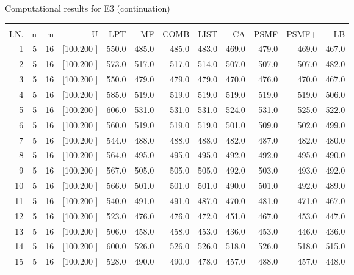 \documentclass[12pt,a4paper]{article}
\begin{document}
\newpage
\begin{center}
 Computational results for E3 (continuation) {\tiny
\begin{tabular}{r r r r r r r r r r r r}\hline
    &   &   &          &        &        &        &        &        &        &        &       \\[-0.1in]
  I.N.  &  n  &  m  &  U  &  LPT  &  MF  &  COMB  &  LIST  &  CA  & PSMF &PSMF+ & LB \\[0.03in]
\hline
   1&  5& 16&[100.200   ]&   550.0&   485.0&   485.0&   483.0&   469.0&   479.0&   469.0&   467.0\\[-0.02in]
   2&  5& 16&[100.200   ]&   573.0&   517.0&   517.0&   514.0&   507.0&   507.0&   507.0&   482.0\\[-0.02in]
   3&  5& 16&[100.200   ]&   550.0&   479.0&   479.0&   479.0&   470.0&   476.0&   470.0&   467.0\\[-0.02in]
   4&  5& 16&[100.200   ]&   585.0&   519.0&   519.0&   519.0&   519.0&   519.0&   519.0&   506.0\\[-0.02in]
   5&  5& 16&[100.200   ]&   606.0&   531.0&   531.0&   531.0&   524.0&   531.0&   525.0&   522.0\\[-0.02in]
   6&  5& 16&[100.200   ]&   560.0&   519.0&   519.0&   519.0&   501.0&   509.0&   502.0&   499.0\\[-0.02in]
   7&  5& 16&[100.200   ]&   544.0&   488.0&   488.0&   488.0&   482.0&   487.0&   482.0&   480.0\\[-0.02in]
   8&  5& 16&[100.200   ]&   564.0&   495.0&   495.0&   495.0&   492.0&   492.0&   495.0&   490.0\\[-0.02in]
   9&  5& 16&[100.200   ]&   567.0&   505.0&   505.0&   505.0&   492.0&   503.0&   493.0&   492.0\\[-0.02in]
  10&  5& 16&[100.200   ]&   566.0&   501.0&   501.0&   501.0&   490.0&   501.0&   492.0&   489.0\\[-0.02in]
  11&  5& 16&[100.200   ]&   540.0&   491.0&   491.0&   487.0&   470.0&   481.0&   471.0&   467.0\\[-0.02in]
  12&  5& 16&[100.200   ]&   523.0&   476.0&   476.0&   472.0&   451.0&   467.0&   453.0&   447.0\\[-0.02in]
  13&  5& 16&[100.200   ]&   506.0&   458.0&   458.0&   453.0&   436.0&   453.0&   446.0&   436.0\\[-0.02in]
  14&  5& 16&[100.200   ]&   600.0&   526.0&   526.0&   526.0&   518.0&   526.0&   518.0&   515.0\\[-0.02in]
  15&  5& 16&[100.200   ]&   528.0&   490.0&   490.0&   478.0&   457.0&   488.0&   457.0&   448.0\\[-0.02in]

\end{tabular}}
\end{center}
\end{document}
